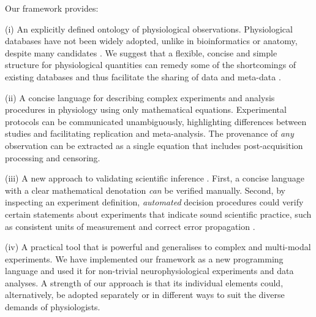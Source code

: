 Our framework provides:

(i) An explicitly defined ontology of physiological
observations. Physiological databases have not been widely
adopted\citep{Herz2008, Amari2002}, unlike in bioinformatics or
anatomy, despite many candidates \citep{Jessop2010, Teeters2008,
  Frishkoff2009, Katz2010}.  We suggest that a flexible, concise and
simple structure for physiological quantities can remedy some of the
shortcomings\citep{Gardner2005, Amari2002} of existing databases and
thus facilitate the sharing of data and meta-data \citep{Insel2003}.

(ii) A concise language for describing complex experiments and
analysis procedures in physiology using only mathematical
equations. Experimental protocols can be communicated unambiguously,
highlighting differences between studies and facilitating replication
and meta-analysis. The provenance
\citep{Pool2002,MacKenzie-Graham2008, VanHorn2009} of \emph{any}
observation can be extracted as a single equation that includes
post-acquisition processing and censoring.

(iii) A new approach to validating scientific inference
\citep{Editors2003, Editors2010}. First, a concise language with a
clear mathematical denotation \emph{can} be verified manually. Second, by
inspecting an experiment definition, \emph{automated} decision procedures
could verify certain statements about experiments that indicate sound
scientific practice, such as consistent units of measurement
\citep{Kennedy1997} and correct error propagation \citep{Taylor1997}.

(iv) A practical tool that is powerful and generalises to complex and
multi-modal experiments. We have implemented our framework as a new
programming language and used it for non-trivial neurophysiological
experiments and data analyses. A strength of our approach is that its
individual elements could, alternatively, be adopted separately or in
different ways to suit the diverse demands of physiologists.
